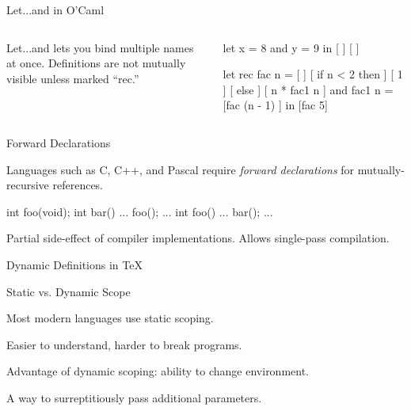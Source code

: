 \documentclass{plt}
\begin{document}
\begin{frame}[fragile]{Let...and in O'Caml}

  \begin{columns}
    \begin{column}{0.5\textwidth}
Let...and lets you bind multiple names at once.  Definitions are not
mutually visible unless marked ``rec.''
    \end{column}
    \begin{column}{0.5\textwidth}
\begin{showscope}
let x = 8
and y = 9 in
[                          ]
[                          ]
\end{showscope}
\begin{showscope}
let rec fac n = [          ]
[     if n < 2 then        ]
[       1                  ]
[     else                 ]
[       n * fac1 n         ]
and fac1 n = [fac (n - 1)  ]
in
[fac 5]%
\end{showscope}
    \end{column}
  \end{columns}
\end{frame}

\begin{frame}[fragile]{Forward Declarations}

Languages such as C, C++, and Pascal require \emph{forward
declarations} for mutually-recursive references.

\begin{C}
int foo(void);
int bar() { ... foo(); ... }
int foo() { ... bar(); ... }
\end{C}

Partial side-effect of compiler implementations.  Allows single-pass
compilation.

\end{frame}

\begin{frame}[fragile]{Dynamic Definitions in \TeX}

\begin{tex}
{
  \def \x 1

  \ifnum \a < 5
    \def \y 2
  \fi

}
\end{tex}

\end{frame}

\begin{frame}{Static vs. Dynamic Scope}

Most modern languages use static scoping.

Easier to understand, harder to break programs.

Advantage of dynamic scoping: ability to change environment.

A way to surreptitiously pass additional parameters.

\end{frame}
\end{document}
